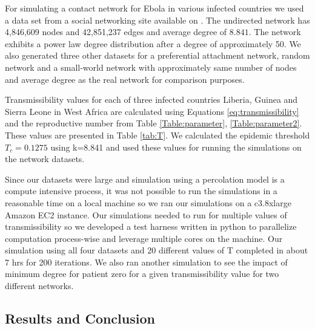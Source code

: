 \documentclass[10pt, journal,onecolumn]{IEEEtran}
\begin{document}
For simulating a contact network for Ebola in various infected countries we used a data set from a
social networking site available on \citep{topcoderdata}. The undirected network has 4,846,609 nodes
and 42,851,237 edges and average degree of $8.841$. The network exhibits a power law degree
distribution after a degree of approximately 50. We also generated three other datasets  for a
preferential attachment network, random network and a small-world network with approximately same
number of nodes and average degree as the real network for comparison purposes.

Transmissibility values for each of three infected countries Liberia, Guinea and Sierra Leone in
West Africa are calculated using Equations \eqref{eq:transmissibility}  and the reproductive number
from Table \ref{Table:parameter}, \ref{Table:parameter2}. These values are presented in Table
\ref{tab:T}.  We calculated the epidemic threshold  $T_c=0.1275$  using k=8.841 and used these
values for  running the simulations on the  network datasets.



Since our datasets were  large and simulation using a percolation model is a compute intensive
process, it was not possible to run the simulations in a reasonable time on a local machine so
we ran our simulations on a c3.8xlarge Amazon EC2 instance. Our simulations needed to run for
multiple values  of transmissibility so we developed a test harness written in python
to parallelize computation process-wise and leverage multiple cores on the machine.
Our simulation using  all
four datasets and 20 different values of T  completed in  about 7 hrs for 200 iterations. We also
ran another simulation to see the impact of minimum degree for patient zero for a given
transmissibility value for two different networks.

\subsection{{Results and Conclusion}}
\end{document}
